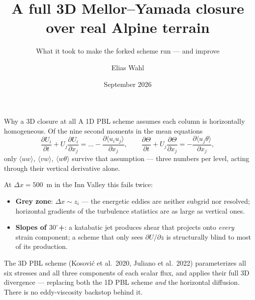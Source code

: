 \documentclass[10pt,aspectratio=169]{beamer}
\title{A full 3D Mellor--Yamada closure over real Alpine terrain}
\subtitle{What it took to make the forked scheme run --- and improve}
\author{Elias Wahl}
\institute{University of Innsbruck}
\date{September 2026}
\newcommand{\avg}[1]{\langle #1 \rangle}
\newcommand{\pd}[2]{\frac{\partial #1}{\partial #2}}
\begin{document}
\begin{frame}
  \titlepage
\end{frame}

\begin{frame}{Why a 3D closure at all}
  A 1D PBL scheme assumes each column is horizontally homogeneous. Of the nine
  second moments in the mean equations
  \[
    \pd{U_i}{t} + U_j \pd{U_i}{x_j}
      = \dots - \pd{\avg{u_i u_j}}{x_j},
    \qquad
    \pd{\Theta}{t} + U_j \pd{\Theta}{x_j} = -\pd{\avg{u_j\theta}}{x_j},
  \]
  only $\avg{uw},\ \avg{vw},\ \avg{w\theta}$ survive that assumption --- three
  numbers per level, acting through their vertical derivative alone.
  \vspace{1ex}

  At $\Delta x = 500$~m in the Inn Valley this fails twice:
  \begin{itemize}
    \item \textbf{Grey zone}: $\Delta x \sim z_i$ --- the energetic eddies are
      neither subgrid nor resolved; horizontal gradients of the turbulence
      statistics are as large as vertical ones.
    \item \textbf{Slopes of $30^\circ$+}: a katabatic jet produces shear that
      projects onto \emph{every} strain component; a scheme that only sees
      $\partial U/\partial z$ is structurally blind to most of its production.
  \end{itemize}
  \vspace{1ex}
  The 3D PBL scheme (Kosovi\'c et al.\ 2020, Juliano et al.\ 2022) parameterizes
  all six stresses and all three components of each scalar flux, and applies
  their full 3D divergence --- replacing both the 1D PBL scheme \emph{and} the
  horizontal diffusion. There is no eddy-viscosity backstop behind it.
\end{frame}
\end{document}
